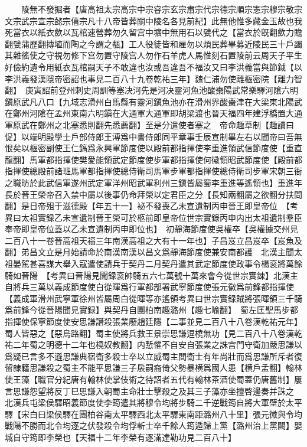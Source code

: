 　　陵無不發掘者【唐高祖太宗高宗中宗睿宗玄宗肅宗代宗德宗順宗憲宗穆宗敬宗文宗武宗宣宗懿宗僖宗凡十八帝皆葬關中陵名各見前紀】此無他惟多藏金玉故也我死當衣以紙衣歛以瓦棺速營葬勿久留宫中壙中無用石以甓代之【當衣於旣翻歛力贍翻甓蒲歷翻摶埴而陶之今謂之甎】工人役徒皆和雇勿以煩民葬畢募近陵民三十戶蠲其雜徭使之守視勿修下宫勿置守陵宫人勿作石羊虎人馬惟刻石置陵前云周天子平生好儉約遺令用紙衣瓦棺嗣天子不敢違也汝或吾違吾不福汝又曰李洪義當與節鉞【以李洪義發漢隱帝密詔也事見二百八十九卷乾祐三年】魏仁浦勿使離樞密院【離力智翻】　庚寅詔前登州刺史周訓等塞决河先是河决靈河魚池酸棗陽武常樂驛河隂六明鎭原武凡八口【九域志滑州白馬縣有靈河鎭魚池亦在滑州界酸棗津在大梁東北陽武在鄭州河隂在孟州東南六明鎭在大通軍大通軍即胡梁渡也晉天福四年建浮橋置大通軍原武在鄭州之北塞悉則翻先悉薦翻】至是分遣使者塞之　帝命趣草制【趣讀曰促】以端明殿學士戶部侍郎王溥爲中書侍郎同平章事壬辰宣制畢左右以聞帝曰吾無恨矣以樞密副使王仁鎬爲永興軍節度使以殿前都指揮使李重進領武信節度使【重直龍翻】馬軍都指揮使樊愛能領武定節度使步軍都指揮使何徽領昭武節度使【殿前都指揮使總殿前諸班馬軍都指揮使總侍衛司馬軍步軍都指揮使總侍衛司步軍宋朝三衙之職昉於此武信軍遂州武定軍洋州昭武軍利州三鎭皆屬蜀李重進等遙領也】重進年長於晉王榮帝召入禁中屬以後事仍命拜榮以定君臣之分【長知兩翻屬之欲翻分扶問翻】是日帝殂于滋德殿【年五十一】袐不發喪乙未宣遺制丙申晉王即皇帝位　【考異曰太祖實録乙未宣遺制晉王榮可於柩前即皇帝位世宗實錄丙申内出太祖遺制羣臣奉帝即皇帝位蓋以乙未宣遺制丙申即位也】　初靜海節度使吳權卒【吳權據交州見二百八十一卷晉高祖天福三年南漢高祖之大有十一年也】子昌岌立昌岌卒【岌魚及翻】弟昌文立是月始請命於南漢南漢以昌文爲靜海節度使兼安南都護　北漢主聞太祖晏駕甚喜謀大舉入寇遣使請兵于契丹二月契丹遣其武定節度使政事令楊衮將萬餘騎如晉陽　【考異曰晉陽見聞録衮帥騎五六七萬號十萬來會今從世宗實鋉】北漢主自將兵三萬以義成節度使白從暉爲行軍都部署武寧節度使張元徽爲前鋒都指揮使【義成軍滑州武寧軍徐州皆屬周白從暉等亦遙領考異曰世宗實録賊將張暉領三千騎爲前鋒今從晉陽聞見實録】與契丹自團柏南趣潞州【趣七喻翻】　蜀左匡聖馬步都指揮使保寧節度使安思謙譖殺張業廢趙廷隱【二事並見二百八十八卷漢乾祐元年】蜀人皆惡之【惡烏路翻】蜀主使將兵救王景崇思謙逗橈無功【見二百八十八卷漢乾祐二年蜀之明德十二年也橈奴教翻】内慙懼不自安自張業之誅宫門守衛加嚴思謙以爲疑已言多不遜思謙典宿衛多殺士卒以立威蜀主閲衛士有年尚壯而爲思謙所斥者復留隸籍思謙殺之蜀主不能平思謙三子扆嗣裔倚父勢暴横爲國人患【横戶孟翻】翰林使王藻【職官分紀唐有翰林使掌伎術之待詔者五代有翰林茶酒使蜀蓋仍唐舊制】屢言思謙怨望將反丁巳思謙入朝蜀主命壯士擊殺之及其三子藻亦坐擅啓邊奏并誅之　北漢兵屯梁侯驛昭義節度使李筠遣其將穆令均將步騎二千逆戰筠自將大軍壁於太平驛【宋白曰梁侯驛在團柏谷南太平驛西北太平驛東南距潞州八十里】張元徽與令均戰陽不勝而北令均逐之伏發殺令均俘斬士卒千餘人筠遁歸上黨【潞州治上黨闕】嬰城自守筠即李榮也【天福十二年李榮有逐滿達勒功見二百八十】

